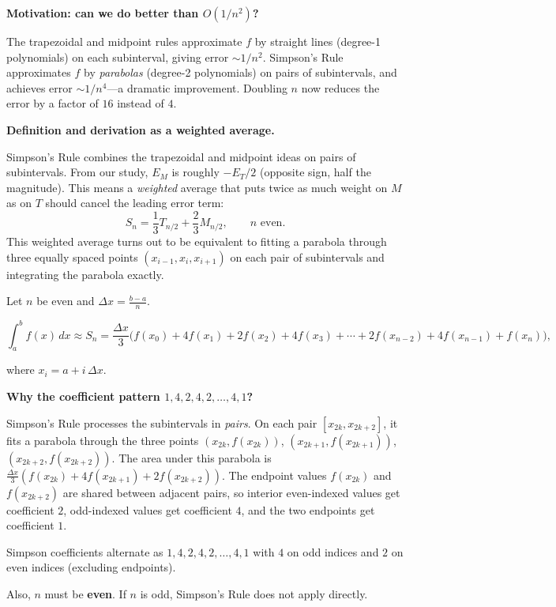 \textbf{Motivation: can we do better than $O(1/n^2)$?}

The trapezoidal and midpoint rules approximate $f$ by straight lines (degree-1 polynomials) on each subinterval, giving error $\sim 1/n^2$. Simpson's Rule approximates $f$ by \emph{parabolas} (degree-2 polynomials) on pairs of subintervals, and achieves error $\sim 1/n^4$---a dramatic improvement. Doubling $n$ now reduces the error by a factor of $16$ instead of $4$.

\textbf{Definition and derivation as a weighted average.}

Simpson's Rule combines the trapezoidal and midpoint ideas on pairs of subintervals. From our study, $E_M$ is roughly $-E_T/2$ (opposite sign, half the magnitude). This means a \emph{weighted} average that puts twice as much weight on $M$ as on $T$ should cancel the leading error term:
\[
S_n = \frac{1}{3}T_{n/2} + \frac{2}{3}M_{n/2},\qquad n \text{ even}.
\]
This weighted average turns out to be equivalent to fitting a parabola through three equally spaced points $(x_{i-1}, x_i, x_{i+1})$ on each pair of subintervals and integrating the parabola exactly.

Let $n$ be even and $\Delta x=\frac{b-a}{n}$.

\begin{keyformula}[title={Key Formula: Simpson's Rule ($n$ even)}]

\[
\int_a^b f(x)\,dx \approx S_n = \frac{\Delta x}{3}\Big(f(x_0)+4f(x_1)+2f(x_2)+4f(x_3)+\cdots+2f(x_{n-2})+4f(x_{n-1})+f(x_n)\Big),
\]

where $x_i=a+i\,\Delta x$.

\end{keyformula}

\textbf{Why the coefficient pattern $1,4,2,4,2,\ldots,4,1$?}

Simpson's Rule processes the subintervals in \emph{pairs}. On each pair $[x_{2k},x_{2k+2}]$, it fits a parabola through the three points $(x_{2k},f(x_{2k}))$, $(x_{2k+1},f(x_{2k+1}))$, $(x_{2k+2},f(x_{2k+2}))$. The area under this parabola is $\frac{\Delta x}{3}(f(x_{2k})+4f(x_{2k+1})+2f(x_{2k+2}))$. The endpoint values $f(x_{2k})$ and $f(x_{2k+2})$ are shared between adjacent pairs, so interior even-indexed values get coefficient $2$, odd-indexed values get coefficient $4$, and the two endpoints get coefficient $1$.

\begin{commonmistake}[title={Common Mistake: Wrong coefficient pattern in Simpson's Rule}]

Simpson coefficients alternate as $1, 4, 2, 4, 2, \ldots, 4, 1$ with $4$ on odd indices and $2$ on even indices (excluding endpoints).

Also, $n$ must be \textbf{even}. If $n$ is odd, Simpson's Rule does not apply directly.

\end{commonmistake}

